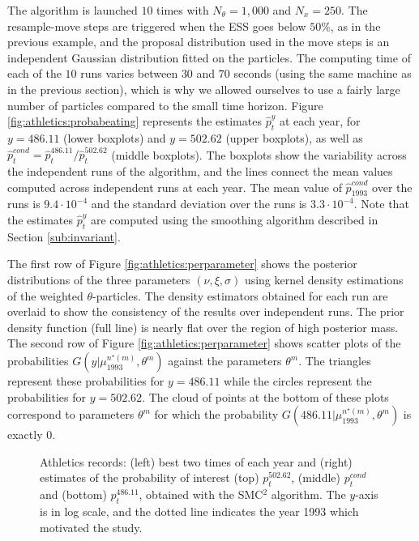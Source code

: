 \documentclass{statsoc}
\newcommand{\SMCSQ}{SMC$^2$\xspace}
\begin{document}
The algorithm is launched $10$ times with $N_\theta= 1,000$ and $N_x =
250$. The resample-move steps are triggered when the ESS goes below $50\%$,
as in the previous example, and the
proposal distribution used in the move steps is an independent Gaussian
distribution fitted on the particles. The computing time of each of the $10$ runs
varies between $30$ and $70$ seconds (using the same machine as in the previous section), which is why we allowed ourselves to 
use a fairly large number of particles compared to the small time horizon.
Figure \ref{fig:athletics:probabeating} represents the estimates $\hat{p}_t^y$ at each year, for $y =
486.11$ (lower boxplots) and $y = 502.62$ (upper boxplots), as well as
$\hat{p}_t^{cond} = \hat{p}_t^{486.11} / \hat{p}_t^{502.62}$
(middle boxplots). The boxplots show the variability across the independent
runs of the algorithm, and the lines connect the mean values computed across
independent runs at each year. The mean value of
$\hat{p}_{1993}^{cond}$ over the runs is
$9.4\cdot 10^{-4}$ and the standard deviation over the runs is $3.3 \cdot
10^{-4}$. Note that the estimates $\hat{p}_t^y$ are computed using
the smoothing algorithm described in Section \ref{sub:invariant}.  

The first row of Figure
\ref{fig:athletics:perparameter} shows
the posterior distributions of the three parameters $(\nu, \xi, \sigma)$ using
kernel density estimations of the weighted $\theta$-particles. The density
estimators obtained for each
run are overlaid to show the consistency of the results over independent runs.
The prior
density function (full line) is nearly flat over the region of
high posterior mass.
The second row of Figure
\ref{fig:athletics:perparameter} shows scatter plots of the probabilities
$G(y \vert \mu_{1993}^{n^\star(m)}, \theta^m)$ against the parameters
$\theta^m$. The triangles represent these probabilities for $y = 486.11$
while the circles represent the probabilities for $y = 502.62$. The cloud
of points at the bottom of these plots correspond to parameters
$\theta^m$ for which the probability $G(486.11 \vert
\mu_{1993}^{n^\star(m)}, \theta^m)$ is exactly 0. 

\begin{figure}
 \centering
 \caption{\label{fig:athletics:peryear}Athletics records: (left) best
two times of each year and (right) estimates of the probability of interest
(top) ${p_t^{502.62}}$, (middle) ${p_t^{cond}}$ and
(bottom) ${p_t^{486.11}}$, obtained with the \SMCSQ algorithm. The
$y$-axis is in log scale, and
the dotted line indicates
the year 1993 which motivated the study.}
\end{figure}
\end{document}
